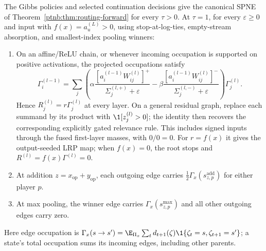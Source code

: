 \begin{theoremenv}\label{ptnb:thm:ab-recovery}\label{ptnb:thm:lrp-recovery}\label{thm:lrp_recovery}
The Gibbs policies and selected continuation decisions give the canonical SPNE of Theorem~\ref{ptnb:thm:routing-forward} for every $\tau>0$. At $\tau=1$, for every $\varepsilon\geq0$ and input with $f(x)=a_u^{(L)}>0$, using stop-at-log-ties, empty-stream absorption, and smallest-index pooling winners:
\begin{enumerate}
 \item On an affine/ReLU chain, or whenever incoming occupation is supported on positive activations, the projected occupations satisfy
 \begin{equation}\label{ptnb:eq:lrp-eps-recovery}
 \Gamma_i^{(l-1)}=\sum_j\left(
 \alpha\frac{[a_i^{(l-1)}W_{ij}^{(l)}]^+}{\Sigma_j^{(l,+)}+\varepsilon}
 -\beta\frac{[a_i^{(l-1)}W_{ij}^{(l)}]^-}{\Sigma_j^{(l,-)}+\varepsilon}
 \right)\Gamma_j^{(l)}.
 \end{equation}
 Hence $R_j^{(l)}=r\Gamma_j^{(l)}$ at every layer. On a general residual graph, replace each summand by its product with $\1[z_j^{(l)}>0]$; the identity then recovers the corresponding explicitly gated relevance rule. This includes signed inputs through the fused first-layer masses, with $0/0=0$. For $r=f(x)$ it gives the output-seeded LRP map; when $f(x)=0$, the root stops and $R^{(l)}=f(x)\Gamma^{(l)}=0$.
 \item At addition $z=x_{\mathrm{op}}+y_{\mathrm{op}}$, each outgoing edge carries $\tfrac12\Gamma_x(s^{\mathrm{add}}_{z,p})$ for either player $p$.
 \item At max pooling, the winner edge carries $\Gamma_x(s^{\max}_{z,p})$ and all other outgoing edges carry zero.
\end{enumerate}
Here edge occupation is $\Gamma_x(s\to s')=\E_{\Pi_x}\sum_t d_{t+1}(\zeta)\1\{\zeta_t=s,\zeta_{t+1}=s'\}$; a state's total occupation sums its incoming edges, including other parents.
\end{theoremenv}
